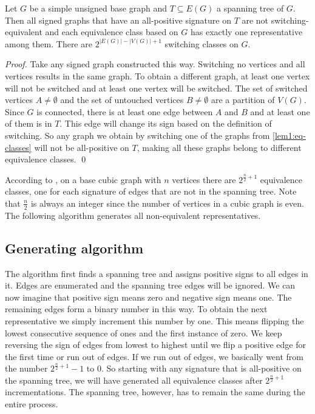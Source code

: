 \begin{theorem}\label{lem1:eq-classes}
    Let $G$ be a simple unsigned base graph and $T \subseteq E(G)$ a spanning tree of $G$. Then all signed graphs that have an all-positive signature on $T$ are not switching-equivalent and each equivalence class based on $G$ has exactly one representative among them. There are $2^{|E(G)| - |V(G)| +1}$ switching classes on $G$.
\end{theorem}

\textit{Proof.} Take any signed graph constructed this way. Switching no vertices and all vertices results in the same graph. To obtain a different graph, at least one vertex will not be switched and at least one vertex will be switched. The set of switched vertices $A \neq \emptyset$ and the set of untouched vertices $B \neq \emptyset$ are a partition of $V(G)$. Since $G$ is connected, there is at least one edge between $A$ and $B$ and at least one of them is in $T$. This edge will change its sign based on the definition of switching. So any graph we obtain by switching one of the graphs from \cref{lem1:eq-classes} will not be all-positive on $T$, making all these graphs belong to different equivalence classes. \qed

According to , on a base cubic graph with $n$ vertices there are $2^{\frac{n}{2}+1}$ equivalence classes, one for each signature of edges that are not in the spanning tree. Note that $\frac{n}{2}$ is always an integer since the number of vertices in a cubic graph is even. The following algorithm generates all non-equivalent representatives.

\subsection{Generating algorithm}

The algorithm first finds a spanning tree and assigns positive signs to all edges in it. Edges are enumerated and the spanning tree edges will be ignored. We can now imagine that positive sign means zero and negative sign means one. The remaining edges form a binary number in this way. To obtain the next representative we simply increment this number by one. This means flipping the lowest consecutive sequence of ones and the first instance of zero. We keep reversing the sign of edges from lowest to highest until we flip a positive edge for the first time or run out of edges. If we run out of edges, we basically went from the number $2^{\frac{n}{2}+1} - 1$ to $0$. So starting with any signature that is all-positive on the spanning tree, we will have generated all equivalence classes after $2^{\frac{n}{2}+1}$ incrementations. The spanning tree, however, has to remain the same during the entire process.

